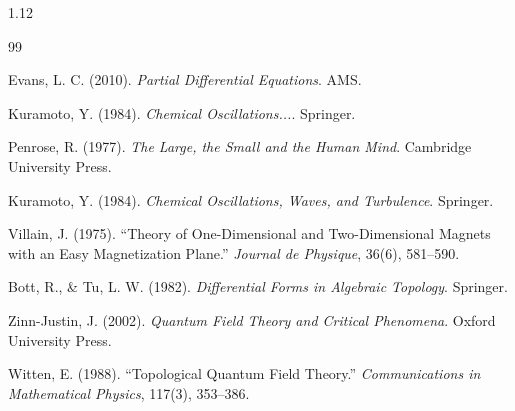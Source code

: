 \documentclass[12pt,a4paper]{article}
\numberwithin{equation}{section}
\theoremstyle{remark}
\theoremstyle{definition}
\begin{document}
\begin{spacing}{1.12}
\begin{thebibliography}{99}

 Evans, L. C. (2010). \emph{Partial Differential Equations}. AMS.

 Kuramoto, Y. (1984). \emph{Chemical Oscillations...}. Springer.

Penrose, R. (1977).
\emph{The Large, the Small and the Human Mind}.
Cambridge University Press.

Kuramoto, Y. (1984).
\emph{Chemical Oscillations, Waves, and Turbulence}.
Springer.

Villain, J. (1975).
``Theory of One-Dimensional and Two-Dimensional Magnets with an Easy Magnetization Plane.''
\emph{Journal de Physique}, 36(6), 581–590.

Bott, R., \& Tu, L. W. (1982).
\emph{Differential Forms in Algebraic Topology}.
Springer.

Zinn-Justin, J. (2002).
\emph{Quantum Field Theory and Critical Phenomena}.
Oxford University Press.

Witten, E. (1988).
``Topological Quantum Field Theory.''
\emph{Communications in Mathematical Physics}, 117(3), 353–386.
\end{thebibliography}

\end{spacing}
\end{document}
